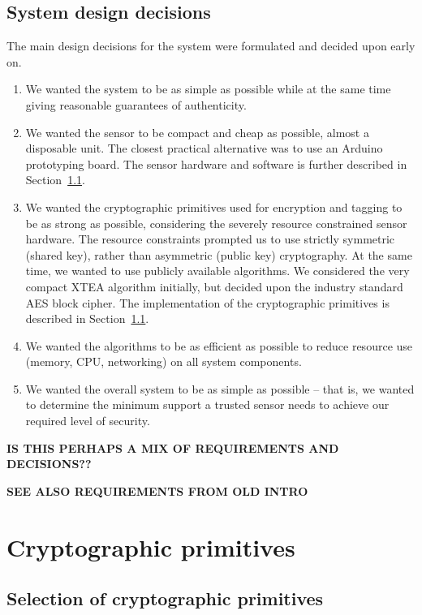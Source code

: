\subsection{System design decisions}

The main design decisions for the system were formulated and decided upon early on.

\begin{enumerate}
\item We wanted the system to be as simple as possible while at the same time giving reasonable guarantees of authenticity.
\item We wanted the sensor to be compact and cheap as possible, almost a disposable unit. The closest practical alternative was to use an Arduino prototyping board. The sensor hardware and software is further described in Section~\ref{}.
\item We wanted the cryptographic primitives used for encryption and tagging to be as strong as possible, considering the severely resource constrained sensor hardware. The resource constraints prompted us to use strictly symmetric (shared key), rather than asymmetric (public key) cryptography. At the same time, we wanted to use publicly available algorithms. We considered the very compact XTEA \cite{} algorithm initially, but decided upon the industry standard AES \cite{} block cipher. The implementation of the cryptographic primitives is described in Section~\ref{}.
\item We wanted the algorithms to be as efficient as possible to reduce resource use (memory, CPU, networking) on all system components.
\item We wanted the overall system to be as simple as possible -- that is, we wanted to determine the minimum support a trusted sensor needs to achieve our required level of security.
\end{enumerate}
\textbf{IS THIS PERHAPS A MIX OF REQUIREMENTS AND DECISIONS??}

\textbf{SEE ALSO REQUIREMENTS FROM OLD INTRO}

\section{Cryptographic primitives}

\subsection{Selection of cryptographic primitives}

